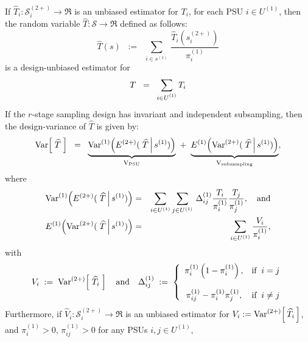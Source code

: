\begin{theorem}\label{rStage}
\mbox{}\vskip 0.1cm
\noindent
If $\widehat{T}_{i} : \mathcal{S}^{(2+)}_{i} \longrightarrow \Re$ is an unbiased estimator for $T_{i}$,
for each \textnormal{PSU} $i \in U^{(1)}$,
then the random variable $\widehat{T} : \mathcal{S} \longrightarrow \Re$ defined as follows:
\begin{equation}
\widehat{T}(s)
\;\;:=\;\;
\sum_{i\in s^{(1)}}\,\frac{\widehat{T}_{i}(s^{(2+)}_{i})}{\pi^{(1)}_{i}}
\end{equation}
is a design-unbiased estimator for
\begin{equation*}
T \;\; = \;\; \sum_{i\in U^{(1)}_{\color{white} i}}T_{i}
\end{equation*}
If the $r$-stage sampling design has invariant and independent subsampling,
then the design-variance of $\widehat{T}$ is given by:
\begin{equation}
\textnormal{Var}\!\left[\;\widehat{T}\;\right]
\;\;=\;\;
\underset{\textnormal{V}_{\textnormal{PSU}}}{\underbrace{\textnormal{Var}^{(1)}\!\left(E^{(2+)}(\,\left.\widehat{T}\,\right\vert s^{(1)})\right)}}
\;+\;
\underset{\textnormal{V}_{\textnormal{subsampling}}}{\underbrace{E^{(1)}\!\left(\textnormal{Var}^{(2+)}(\,\left.\widehat{T}\,\right\vert s^{(1)})\right)}},
\end{equation}
where
\begin{eqnarray*}
\textnormal{Var}^{(1)}\!\left(E^{(2+)}(\,\left.\widehat{T}\,\right\vert s^{(1)})\right)
&=&
\sum_{i\in U^{(1)}}\sum_{j\in U^{(1)}}\,\Delta^{(1)}_{ij}\frac{T_{i}}{\pi^{(1)}_{i}}\frac{T_{j}}{\pi^{(1)}_{j}},\quad\textnormal{and}
\\
E^{(1)}\!\left(\textnormal{Var}^{(2+)}(\,\left.\widehat{T}\,\right\vert s^{(1)})\right)
&=&
\sum_{i\in U^{(1)}}\frac{V_{i}}{\pi^{(1)}_{i}},
\end{eqnarray*}
with
\begin{equation}
V_{i} \;:=\; \textnormal{Var}^{(2+)}\!\left[\;\widehat{T}_{i}\;\right]
\quad\textnormal{and}\quad
\Delta^{(1)}_{ij}\;:=\;
\left\{
\begin{array}{cl}
\pi^{(1)}_{i}\left(1 - \pi^{(1)}_{i}\right), & \textnormal{if}\;\; i = j
\\ \\
\pi^{(1)}_{ij} - \pi^{(1)}_{i}\pi^{(1)}_{j}, & \textnormal{if}\;\; i \neq j
\end{array}
\right.
\end{equation}
Furthermore, if $\widehat{V}_{i} : \mathcal{S}^{(2+)}_{i} \longrightarrow \Re$
is an unbiased estimator for
$V_{i} := \textnormal{Var}^{(2+)}\!\left[\,\widehat{T}_{i}\,\right]$, and
$\pi^{(1)}_{i} > 0$, $\pi^{(1)}_{ij} > 0$ for any \textnormal{PSU}s $i,j \in U^{(1)}$,

\end{theorem}
